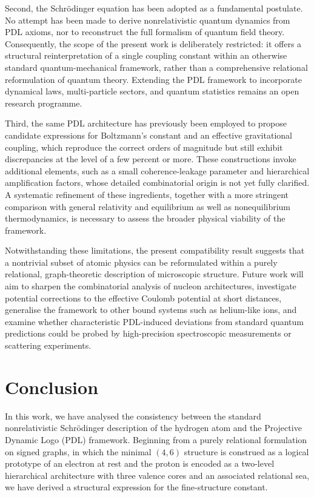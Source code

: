 \documentclass[12pt,a4paper]{article}
\begin{document}
Second, the Schr\"odinger equation has been adopted as a fundamental postulate. No attempt has been made to derive nonrelativistic quantum dynamics from PDL axioms, nor to reconstruct the full formalism of quantum field theory. Consequently, the scope of the present work is deliberately restricted: it offers a structural reinterpretation of a single coupling constant within an otherwise standard quantum-mechanical framework, rather than a comprehensive relational reformulation of quantum theory. Extending the PDL framework to incorporate dynamical laws, multi-particle sectors, and quantum statistics remains an open research programme.\cite{Laubscher2026IntroPDL,Laubscher2026PDL_English}

Third, the same PDL architecture has previously been employed to propose candidate expressions for Boltzmann’s constant and an effective gravitational coupling, which reproduce the correct orders of magnitude but still exhibit discrepancies at the level of a few percent or more. These constructions invoke additional elements, such as a small coherence-leakage parameter and hierarchical amplification factors, whose detailed combinatorial origin is not yet fully clarified. A systematic refinement of these ingredients, together with a more stringent comparison with general relativity and equilibrium as well as nonequilibrium thermodynamics, is necessary to assess the broader physical viability of the framework.\cite{Laubscher2026PDL_English,Laubscher2026LDP_French}

Notwithstanding these limitations, the present compatibility result suggests that a nontrivial subset of atomic physics can be reformulated within a purely relational, graph-theoretic description of microscopic structure. Future work will aim to sharpen the combinatorial analysis of nucleon architectures, investigate potential corrections to the effective Coulomb potential at short distances, generalise the framework to other bound systems such as helium-like ions, and examine whether characteristic PDL-induced deviations from standard quantum predictions could be probed by high-precision spectroscopic measurements or scattering experiments.\cite{Laubscher2026PDL_English,Laubscher2026LDP_French}

\section{Conclusion}

In this work, we have analysed the consistency between the standard nonrelativistic Schr\"odinger description of the hydrogen atom and the Projective Dynamic Logo (PDL) framework.
Beginning from a purely relational formulation on signed graphs, in which the minimal \((4,6)\) structure is construed as a logical prototype of an electron at rest and the proton is encoded as a two-level hierarchical architecture with three valence cores and an associated relational sea, we have derived a structural expression for the fine-structure constant.
\end{document}
